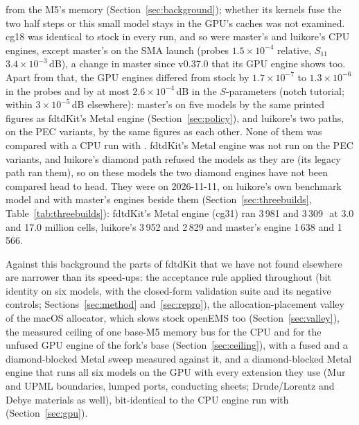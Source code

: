 from the M5's memory (Section~\ref{sec:background}); whether its kernels fuse the two half steps or this small model
stays in the GPU's caches was not examined. cg18 was identical to stock in every run, and so were
master's and luikore's CPU engines, except master's on the SMA launch (probes $1.5\times10^{-4}$ relative, $S_{11}$
$3.4\times10^{-3}$\,dB), a change in master since v0.37.0 that its GPU engine shows too. Apart from that, the GPU
engines differed from stock by $1.7\times10^{-7}$ to $1.3\times10^{-6}$ in the probes and by at most
$2.6\times10^{-4}$\,dB in the $S$-parameters (notch tutorial; within $3\times10^{-5}$\,dB elsewhere): master's on five
models by the same printed figures as fdtdKit's Metal engine (Section~\ref{sec:policy}), and luikore's two paths, on
the PEC variants, by the same figures as each other. None of them was compared with a CPU run with
. fdtdKit's Metal engine was not run on the PEC variants, and luikore's diamond path refused the
models as they are (its legacy path ran them), so on these models the two diamond engines have not been compared head
to head. They were on 2026-11-11, on luikore's own benchmark model and with master's engines beside them
(Section~\ref{sec:threebuilds}, Table~\ref{tab:threebuilds}): fdtdKit's Metal engine (cg31) ran 3\,981 and
3\,309\,\MC\ at 3.0 and 17.0 million cells, luikore's 3\,952 and 2\,829 and master's  engine 1\,638 and
1\,566.

Against this background the parts of fdtdKit that we have not found elsewhere are narrower than its speed-ups: the
acceptance rule applied throughout (bit identity on six models, with the closed-form validation suite and its
negative controls; Sections~\ref{sec:method} and~\ref{sec:repro}), the allocation-placement valley of the macOS
allocator, which slows stock openEMS too (Section~\ref{sec:valley}), the measured ceiling of one base-M5 memory bus
for the CPU and for the unfused GPU engine of the fork's base (Section~\ref{sec:ceiling}), with a fused and a
diamond-blocked Metal sweep
measured against it, and a diamond-blocked Metal engine that runs all six models on the GPU with every extension they
use (Mur and UPML boundaries, lumped ports, conducting sheets; Drude/Lorentz and Debye materials as well), bit-identical
to the CPU engine run with  (Section~\ref{sec:gpu}).

